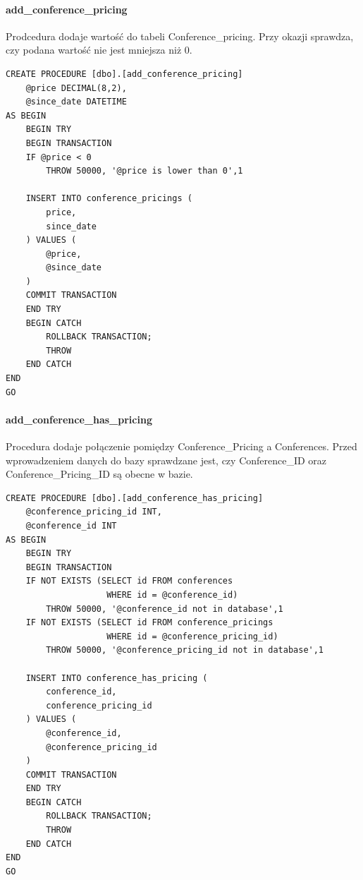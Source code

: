 \documentclass[12pt]{article}
\begin{document}
\paragraph{add\_conference\_pricing \\}
Prodcedura dodaje wartość do tabeli Conference\_pricing. Przy okazji sprawdza, czy podana wartość nie jest mniejsza niż 0. \\
\begin{lstlisting}
CREATE PROCEDURE [dbo].[add_conference_pricing]
	@price DECIMAL(8,2),
	@since_date DATETIME
AS BEGIN
	BEGIN TRY
	BEGIN TRANSACTION
	IF @price < 0
		THROW 50000, '@price is lower than 0',1

	INSERT INTO conference_pricings (
		price,
		since_date
	) VALUES (
		@price,
		@since_date
	)
	COMMIT TRANSACTION
	END TRY
	BEGIN CATCH
		ROLLBACK TRANSACTION;
		THROW
	END CATCH
END
GO

\end{lstlisting}
\newpage

\paragraph{add\_conference\_has\_pricing\\}
Procedura dodaje połączenie pomiędzy Conference\_Pricing a Conferences. Przed wprowadzeniem danych do bazy sprawdzane jest, czy Conference\_ID oraz Conference\_Pricing\_ID są obecne w bazie. \\
\begin{lstlisting}
CREATE PROCEDURE [dbo].[add_conference_has_pricing]
	@conference_pricing_id INT,
	@conference_id INT
AS BEGIN
	BEGIN TRY
	BEGIN TRANSACTION
	IF NOT EXISTS (SELECT id FROM conferences
    				WHERE id = @conference_id)
		THROW 50000, '@conference_id not in database',1
	IF NOT EXISTS (SELECT id FROM conference_pricings
    				WHERE id = @conference_pricing_id)
		THROW 50000, '@conference_pricing_id not in database',1

	INSERT INTO conference_has_pricing (
		conference_id,
		conference_pricing_id
	) VALUES (
		@conference_id,
		@conference_pricing_id
	)
	COMMIT TRANSACTION
	END TRY
	BEGIN CATCH
		ROLLBACK TRANSACTION;
		THROW
	END CATCH
END
GO

\end{lstlisting}
\newpage
\end{document}
